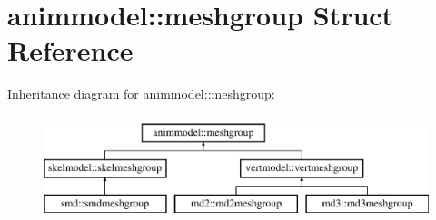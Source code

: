 \hypertarget{structanimmodel_1_1meshgroup}{}\section{animmodel\+:\+:meshgroup Struct Reference}
\label{structanimmodel_1_1meshgroup}
Inheritance diagram for animmodel\+:\+:meshgroup\+:\begin{figure}[H]
\begin{center}
\leavevmode
\includegraphics[height=3.000000cm]{structanimmodel_1_1meshgroup}
\end{center}
\end{figure}
